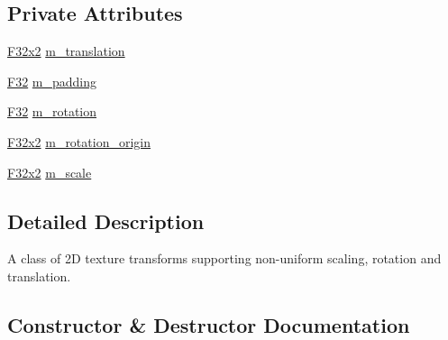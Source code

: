 \subsection*{Private Attributes}
\begin{DoxyCompactItemize}
\item 
\mbox{\hyperlink{namespacemage_aee4759dedc8def6c6dec26b5c7eddf29}{F32x2}} \mbox{\hyperlink{classmage_1_1_texture_transform2_d_a31dc714e85f735e4808718e81dca6932}{m\+\_\+translation}}
\item 
\mbox{\hyperlink{namespacemage_aa97e833b45f06d60a0a9c4fc22ae02c0}{F32}} \mbox{\hyperlink{classmage_1_1_texture_transform2_d_ac77e0d47412dee612ca006f62ffde089}{m\+\_\+padding}}
\item 
\mbox{\hyperlink{namespacemage_aa97e833b45f06d60a0a9c4fc22ae02c0}{F32}} \mbox{\hyperlink{classmage_1_1_texture_transform2_d_ad1e26e4990709a19ab3d72ac14b194de}{m\+\_\+rotation}}
\item 
\mbox{\hyperlink{namespacemage_aee4759dedc8def6c6dec26b5c7eddf29}{F32x2}} \mbox{\hyperlink{classmage_1_1_texture_transform2_d_aaedd99873df6556a225a8a399a934b3f}{m\+\_\+rotation\+\_\+origin}}
\item 
\mbox{\hyperlink{namespacemage_aee4759dedc8def6c6dec26b5c7eddf29}{F32x2}} \mbox{\hyperlink{classmage_1_1_texture_transform2_d_aa5e90db4dfa9012cd8c2d56f0d9c82c3}{m\+\_\+scale}}
\end{DoxyCompactItemize}


\subsection{Detailed Description}
A class of 2D texture transforms supporting non-\/uniform scaling, rotation and translation. 

\subsection{Constructor \& Destructor Documentation}
\mbox{\label{classmage_1_1_texture_transform2_d_a9833dce43985ee12c80aea2c1f14650e}} 
